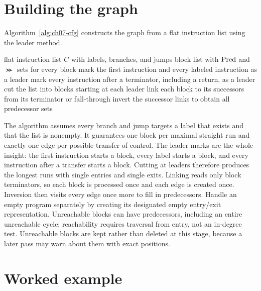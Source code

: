 \section{Building the graph}
\label{sec:ch07-building-graph}

Algorithm~\ref{alg:ch07-cfg} constructs the graph from a flat instruction list using the leader method.
\begin{algorithm}
\caption{Leader-based construction of the control-flow graph.}
\label{alg:ch07-cfg}
\begin{pseudocode}
\Require flat instruction list $C$ with labels, branches, and jumps
\Ensure block list with $\operatorname{Pred}$ and $\Succ$ sets for every block
\State mark the first instruction and every labeled instruction as a leader
\State mark every instruction after a terminator, including a return, as a leader
\State cut the list into blocks starting at each leader
\State link each block to its successors from its terminator or fall-through
\State invert the successor links to obtain all predecessor sets
\EndFunction
\end{pseudocode}
\end{algorithm}
The algorithm assumes every branch and jump targets a label that exists and that the list is nonempty.
It guarantees one block per maximal straight run and exactly one edge per possible transfer of control.
The leader marks are the whole insight: the first instruction starts a block, every label starts a block, and every instruction after a transfer starts a block.
Cutting at leaders therefore produces the longest runs with single entries and single exits.
Linking reads only block terminators, so each block is processed once and each edge is created once.
Inversion then visits every edge once more to fill in predecessors.
Handle an empty program separately by creating its designated empty entry/exit representation.
Unreachable blocks can have predecessors, including an entire unreachable cycle; reachability requires traversal from entry, not an in-degree test.
Unreachable blocks are kept rather than deleted at this stage, because a later pass may warn about them with exact positions.

\section{Worked example}
\label{sec:ch07-worked-example}

